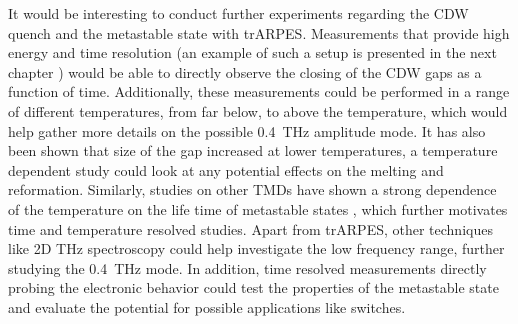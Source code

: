 It would be interesting to conduct further experiments regarding the CDW quench and the metastable state with trARPES.
Measurements that provide high energy and time resolution (an example of such a setup is presented in the next chapter \cite{hellbruck_high-resolution_2024}) would be able to directly observe the closing of the CDW gaps as a function of time.
Additionally, these measurements could be performed in a range of different temperatures, from far below, to above the temperature, which would help gather more details on the possible \qty{0.4}{\tera\hertz} amplitude mode.
It has also been shown \cite{lin_evidence_2022} that size of the gap increased at lower temperatures, a temperature dependent study could look at any potential effects on the melting and reformation.
Similarly, studies on other TMDs have shown a strong dependence of the temperature on the life time of metastable states \cite{stojchevska_ultrafast_2014, vaskivskyi_controlling_2015}, which further motivates time and temperature resolved studies.
Apart from trARPES, other techniques like 2D \unit{\tera\hertz} spectroscopy could help investigate the low frequency range, further studying the \qty{0.4}{\tera\hertz} mode.
In addition, time resolved measurements directly probing the electronic behavior could test the properties of the metastable state and evaluate the potential for possible applications like switches.

